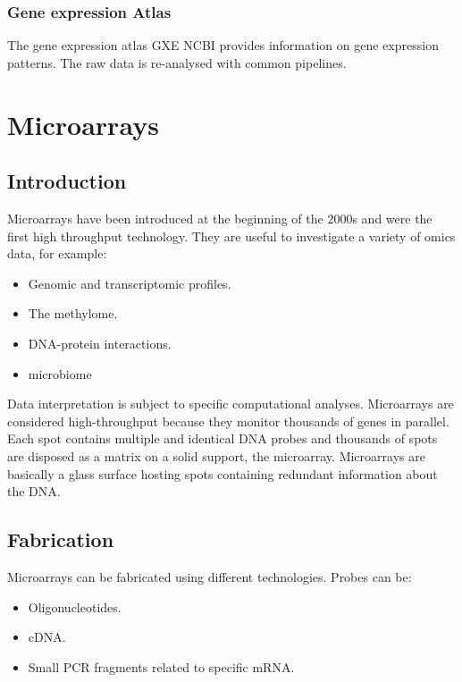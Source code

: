 		\subsubsection{Gene expression Atlas}
		The gene expression atlas GXE NCBI provides information on gene expression patterns.
		The raw data is re-analysed with common pipelines.




\section{Microarrays}

	\subsection{Introduction}
	Microarrays have been introduced at the beginning of the $2000$s and were the first high throughput technology.
	They are useful to investigate a variety of omics data, for example:

	\begin{multicols}{2}
		\begin{itemize}
			\item Genomic and transcriptomic profiles.
			\item The methylome.
			\item DNA-protein interactions.
			\item microbiome
		\end{itemize}
	\end{multicols}

	Data interpretation is subject to specific computational analyses.
	Microarrays are considered high-throughput because they monitor thousands of genes in parallel.
	Each spot contains multiple and identical DNA probes and thousands of spots are disposed as a matrix on a solid support, the microarray. 
	Microarrays are basically a glass surface hosting spots containing redundant information about the DNA. 

	\subsection{Fabrication}
	Microarrays can be fabricated using different technologies.
	Probes can be:

	\begin{multicols}{3}
		\begin{itemize}
			\item Oligonucleotides.
			\item cDNA.
			\item Small PCR fragments related to specific mRNA.
		\end{itemize}
	\end{multicols}

